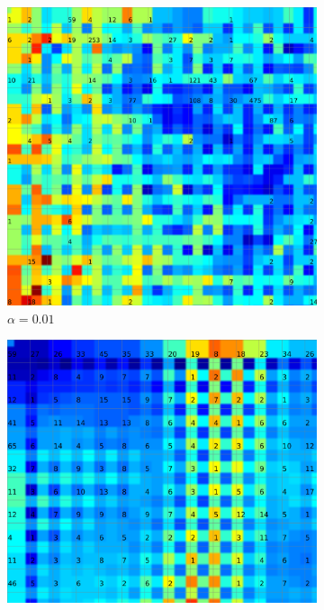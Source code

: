 \documentclass{acm_proc_article-sp}
\begin{document}
\begin{figure}
\centering
    \centering
    \begin{subfigure}[b]{0.24\linewidth}
        \includegraphics[width=\linewidth]{img/wine-20x16-u-matrix-alpha-0.01}
        \caption{$\alpha=0.01$}
        \label{fig:wine-20x16-u-matrix-alpha-0.01}
    \end{subfigure}
    \begin{subfigure}[b]{0.24\linewidth}
        \includegraphics[width=\linewidth]{img/wine-20x16-u-matrix-alpha-0.45}

\end{subfigure}
\end{figure}
\end{document}
